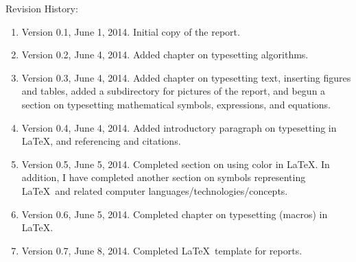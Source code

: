 Revision History: \vspace{-0.3cm}
\begin{enumerate} \itemsep -4pt
\item Version 0.1, June 1, 2014. Initial copy of the report.
\item Version 0.2, June 4, 2014. Added chapter on typesetting algorithms.
\item Version 0.3, June 4, 2014. Added chapter on typesetting text, inserting figures and tables, added a subdirectory for pictures of the report, and begun a section on typesetting mathematical symbols, expressions, and equations.
\item Version 0.4, June 4, 2014. Added introductory paragraph on typesetting in \LaTeX, and referencing and citations.
\item Version 0.5, June 5, 2014. Completed section on using color in \LaTeX. In addition, I have completed another section on symbols representing \LaTeX\ and related computer languages/technologies/concepts.
\item Version 0.6, June 5, 2014. Completed chapter on typesetting (macros) in \LaTeX.
\item Version 0.7, June 8, 2014. Completed \LaTeX\ template for reports.
\end{enumerate}


